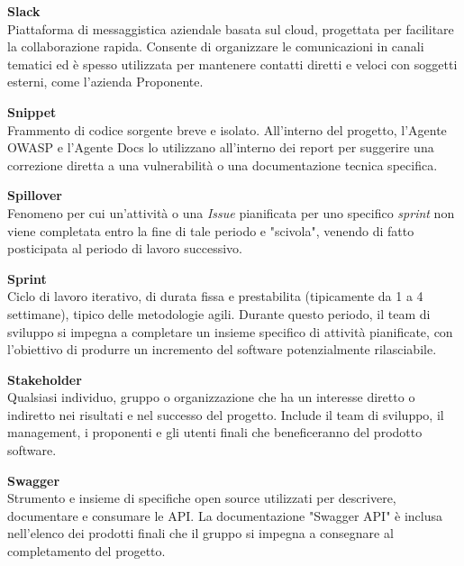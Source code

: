 \documentclass[12pt, a4paper]{article}
\begin{document}
\newpage
\noindent\hypertarget{slack}{\textbf{Slack}} \\[0.1em]
Piattaforma di messaggistica aziendale basata sul cloud, progettata per facilitare la collaborazione rapida. Consente di organizzare le comunicazioni in canali tematici ed è spesso utilizzata per mantenere contatti diretti e veloci con soggetti esterni, come l'azienda Proponente.
\vspace{0.5cm}

\noindent\hypertarget{snippet}{\textbf{Snippet}} \\[0.1em]
Frammento di codice sorgente breve e isolato. All'interno del progetto, l'Agente OWASP e l'Agente Docs lo utilizzano all'interno dei report per suggerire una correzione diretta a una vulnerabilità o una documentazione tecnica specifica.
\vspace{0.5cm}  

\noindent\hypertarget{spillover}{\textbf{Spillover}} \\[0.1em]
Fenomeno per cui un'attività o una \textit{Issue} pianificata per uno specifico \textit{sprint} non viene completata entro la fine di tale periodo e "scivola", venendo di fatto posticipata al periodo di lavoro successivo.
\vspace{0.5cm}

\noindent\hypertarget{sprint}{\textbf{Sprint}} \\[0.1em]
Ciclo di lavoro iterativo, di durata fissa e prestabilita (tipicamente da 1 a 4 settimane), tipico delle metodologie agili. Durante questo periodo, il team di sviluppo si impegna a completare un insieme specifico di attività pianificate, con l'obiettivo di produrre un incremento del software potenzialmente rilasciabile.
\vspace{0.5cm}

\noindent\hypertarget{stakeholder}{\textbf{Stakeholder}} \\[0.1em]
Qualsiasi individuo, gruppo o organizzazione che ha un interesse diretto o indiretto nei risultati e nel successo del progetto. Include il team di sviluppo, il management, i proponenti e gli utenti finali che beneficeranno del prodotto software.
\vspace{0.1cm}

\noindent\hypertarget{swagger}{\textbf{Swagger}} \\[0.1em]
Strumento e insieme di specifiche open source utilizzati per descrivere, documentare e consumare le API. La documentazione "Swagger API" è inclusa nell'elenco dei prodotti finali che il gruppo si impegna a consegnare al completamento del progetto.
\vspace{0.5cm}  
\end{document}
